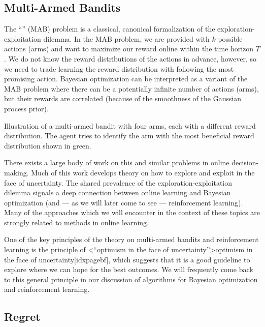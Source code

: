 \subsection{Multi-Armed Bandits}\label{sec:bayesian_optimization:online_learning:mab}

The ``'' (MAB) problem is a classical, canonical formalization of the exploration-exploitation dilemma.
In the MAB  problem, we are provided with $k$ possible actions (arms) and want to maximize our reward online within the time horizon $T$.
We do not know the reward distributions of the actions in advance, however, so we need to trade learning the reward distribution with following the most promising action.
Bayesian optimization can be interpreted as a variant of the MAB problem where there can be a potentially infinite number of actions (arms), but their rewards are correlated (because of the smoothness of the Gaussian process prior).

\begin{marginfigure}
  \caption{Illustration of a multi-armed bandit with four arms, each with a different reward distribution.
  The agent tries to identify the arm with the most beneficial reward distribution shown in green.}
\end{marginfigure}

There exists a large body of work on this and similar problems in online decision-making.
Much of this work develops theory on how to explore and exploit in the face of uncertainty.
The shared prevalence of the exploration-exploitation dilemma signals a deep connection between online learning and Bayesian optimization (and --- as we will later come to see --- reinforcement learning).
Many of the approaches which we will encounter in the context of these topics are strongly related to methods in online learning.

One of the key principles of the theory on multi-armed bandits and reinforcement learning is the principle of \midx<``optimism in the face of uncertainty''>{optimism in the face of uncertainty}[idxpagebf], which suggests that it is a good guideline to explore where we can hope for the best outcomes.
We will frequently come back to this general principle in our discussion of algorithms for Bayesian optimization and reinforcement learning.


\subsection{Regret}

